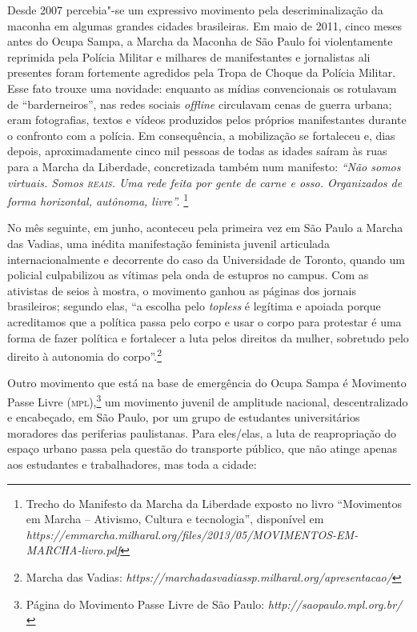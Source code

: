 Desde 2007 percebia"-se um expressivo movimento pela descriminalização da
maconha em algumas grandes cidades brasileiras. Em maio de 2011, cinco
meses antes do Ocupa Sampa, a Marcha da Maconha de São Paulo foi
violentamente reprimida pela Polícia Militar e milhares de manifestantes
e jornalistas ali presentes foram fortemente agredidos pela Tropa de
Choque da Polícia Militar. Esse fato trouxe uma novidade: enquanto as
mídias convencionais os rotulavam de ``barderneiros'', nas redes sociais
\emph{\emph{offline}} circulavam cenas de guerra urbana; eram fotografias,
textos e vídeos produzidos pelos próprios manifestantes durante o
confronto com a polícia. Em consequência, a mobilização se fortaleceu e,
dias depois, aproximadamente cinco mil pessoas de todas as idades saíram
às ruas para a Marcha da Liberdade, concretizada também num manifesto:
\emph{``Não somos virtuais. Somos \textsc{reais}. Uma rede feita por gente de
carne e osso. Organizados de forma horizontal, autônoma, livre''.}
\footnote{Trecho do Manifesto da Marcha da Liberdade exposto no livro
  ``Movimentos em Marcha -- Ativismo, Cultura e tecnologia'', disponível
  em
  \emph{https://emmarcha.milharal.org/files/2013/05/MOVIMENTOS-EM-MARCHA-livro.pdf}}

No mês seguinte, em junho, aconteceu pela primeira vez em São Paulo a
Marcha das Vadias, uma inédita manifestação feminista juvenil articulada
internacionalmente e decorrente do caso da Universidade de Toronto,
quando um policial culpabilizou as vítimas pela onda de estupros no
campus. Com as ativistas de seios à mostra, o movimento ganhou as
páginas dos jornais brasileiros; segundo elas, ``a escolha pelo
\emph{topless} é legítima e apoiada porque acreditamos que a política
passa pelo corpo e usar o corpo para protestar é uma forma de fazer
política e fortalecer a luta pelos direitos da mulher, sobretudo pelo
direito à autonomia do corpo''.\footnote{Marcha das Vadias:
  \emph{https://marchadasvadiassp.milharal.org/apresentacao/}}

Outro movimento que está na base de emergência do Ocupa Sampa é
Movimento Passe Livre (\textsc{mpl}),\footnote{Página do Movimento Passe Livre de
  São Paulo: \emph{http://saopaulo.mpl.org.br/}} um movimento juvenil de
amplitude nacional, descentralizado e encabeçado, em São Paulo, por um
grupo de estudantes universitários moradores das periferias
paulistanas. Para eles/elas, a luta de reapropriação do espaço urbano
passa pela questão do transporte público, que não atinge apenas aos
estudantes e trabalhadores, mas toda a cidade:

